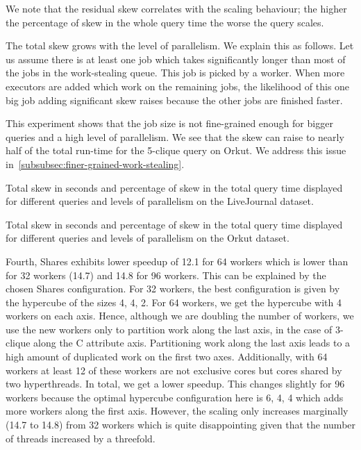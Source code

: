 We note that the residual skew correlates with the scaling behaviour;
the higher the percentage of skew in the whole query time the worse the query scales.

The total skew grows with the level of parallelism.
We explain this as follows.
Let us assume there is at least one job which takes significantly longer than most of the jobs in
the work-stealing queue.
This job is picked by a worker.
When more executors are added which work on the remaining jobs, the likelihood of this one big
job adding significant skew raises because the other jobs are finished faster.

This experiment shows that the job size is not fine-grained enough for bigger queries and a high level of parallelism.
We see that the skew can raise to nearly half of the total run-time for the 5-clique query
on Orkut.
We address this issue in~\cref{subsubsec:finer-grained-work-stealing}.

\begin{table}
    \centering
    
    \caption{
    Total skew in seconds and percentage of skew in the total query time displayed for different
    queries and levels of parallelism on the LiveJournal dataset.
    }\label{table:skew-liveJ}
\end{table}

\begin{table}
    \centering
    
    \caption{
    Total skew in seconds and percentage of skew in the total query time displayed for different
    queries and levels of parallelism on the Orkut dataset.
    }\label{table:skew-orkut}
\end{table}

Fourth, Shares exhibits lower speedup of 12.1 for 64 workers which is
lower than for 32 workers (14.7) and 14.8 for 96 workers.
This can be explained by the chosen Shares configuration.
For 32 workers, the best configuration is given by the hypercube of the sizes 4, 4, 2.
For 64 workers, we get the hypercube with 4 workers on each axis.
Hence, although we are doubling the number of workers, we use the new workers only to partition
work along the last axis, in the case of 3-clique along the C attribute axis.
Partitioning work along the last axis leads to a high amount of duplicated work on the first
two axes.
Additionally, with 64 workers at least 12 of these workers are not exclusive cores but cores shared by
two hyperthreads.
In total, we get a lower speedup.
This changes slightly for 96 workers because the optimal hypercube configuration here is 6, 4, 4 which
adds more workers along the first axis.
However, the scaling only increases marginally (14.7 to 14.8) from 32 workers which is quite disappointing given
that the number of threads increased by a threefold.

